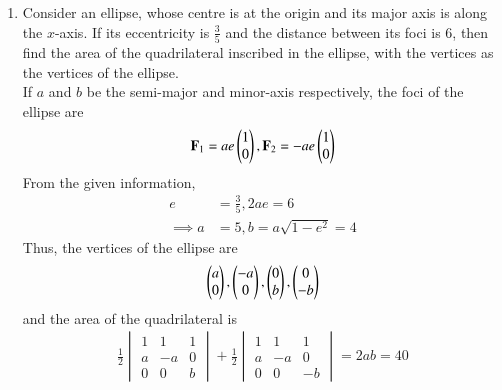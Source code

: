 \documentclass[journal,12pt,twocolumn]{IEEEtran}
\begin{document}
\begin{enumerate}[label=\arabic*]
\item  Consider an ellipse, whose centre is at the origin and its major axis is along the $x$-axis.  If its 
eccentricity is $\frac{3}{5}$ and the distance between its foci is 6, then find the area of the quadrilateral 
inscribed in the ellipse,  with the vertices as the vertices of the ellipse.
\\
\solution If $a$ and $b$ be the semi-major and minor-axis respectively, 
the foci of the ellipse are 
\begin{align}
\mathbf{F}_1=ae\begin{pmatrix}1\\0\end{pmatrix},
\mathbf{F}_2=-ae\begin{pmatrix}1\\0\end{pmatrix}
\end{align}
%
From the given information,
\begin{align}
e &= \frac{3}{5}, 2ae = 6 
\\
\implies a &= 5, b = a\sqrt{1-e^2} = 4
\end{align}
%
Thus, the vertices of the ellipse are
\begin{align}
\begin{pmatrix}a\\0\end{pmatrix},
\begin{pmatrix}-a\\0\end{pmatrix},
\begin{pmatrix}0\\b\end{pmatrix},
\begin{pmatrix}0\\-b\end{pmatrix}
\end{align}
and the area of the quadrilateral is
\begin{align}
\frac{1}{2}
\begin{vmatrix}
1 & 1 & 1
\\
a & -a & 0
\\
0 & 0 & b
\end{vmatrix}
+
\frac{1}{2}
\begin{vmatrix}
1 & 1 & 1
\\
a & -a & 0
\\
0 & 0 & -b
\end{vmatrix}
=2ab = 40
\end{align}


\end{enumerate}
\end{document}
